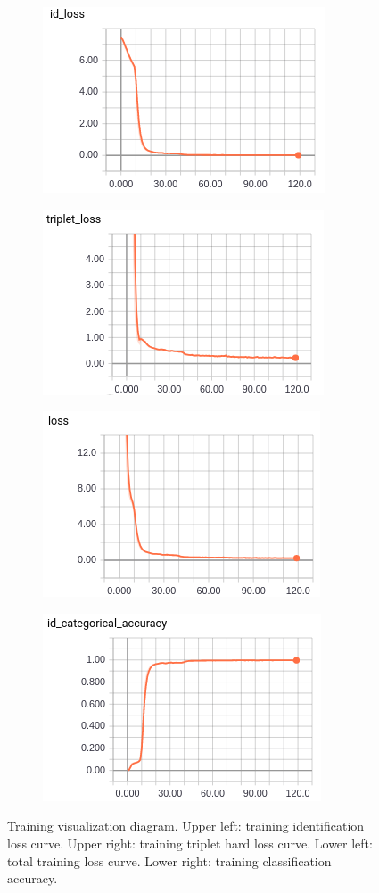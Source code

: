 \begin{figure}
    \begin{subfigure}
        \centering
        \includegraphics[width=.5\linewidth]{figures/train_id_loss.png}
    \end{subfigure}
    \begin{subfigure}
        \centering
        \includegraphics[width=.5\linewidth]{figures/train_triplet_loss.png}
    \end{subfigure}
    \begin{subfigure}
        \centering
        \includegraphics[width=.5\linewidth]{figures/train_loss.png}
    \end{subfigure}
    \begin{subfigure}
        \centering
        \includegraphics[width=.5\linewidth]{figures/train_acc.png}
    \end{subfigure}
    \caption[Training visualization diagram]
    {Training visualization diagram. Upper left: training identification loss
        curve. Upper right: training triplet hard loss curve. Lower left: total
        training loss curve. Lower right: training classification accuracy.}
    \label{fig:fw-training}
\end{figure}

